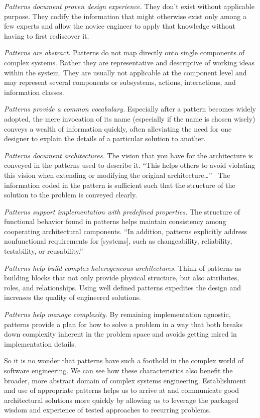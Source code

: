 \documentclass[jou,apacite]{apa6}
\begin{document}
\emph{Patterns document proven design experience.}  They don't exist without applicable purpose.  They codify the information that might otherwise exist only among a few experts and allow the novice engineer to apply that knowledge without having to first rediscover it.

\emph{Patterns are abstract.}  Patterns do not map directly onto single components of complex systems. Rather they are representative and descriptive of working ideas within the system.  They are usually not applicable at the component level and may represent several components or subsystems, actions, interactions, and information classes.

\emph{Patterns provide a common vocabulary.}  Especially after a pattern becomes widely adopted, the mere invocation of its name (especially if the name is chosen wisely) conveys a wealth of information quickly, often alleviating the need for one designer to explain the details of a particular solution to another.

\emph{Patterns document architectures.} The vision that you have for the architecture is conveyed in the patterns used to describe it.  ``This helps others to avoid violating this vision when extending or modifying the original architecture\dots''~\cite[page 6]{Buschmann}  The information coded in the pattern is sufficient such that the structure of the solution to the problem is conveyed clearly.

\emph{Patterns support implementation with predefined properties.}  The structure of functional behavior found in patterns helps maintain consistency among cooperating architectural components.  ``In addition, patterns explicitly address nonfunctional requirements for [systems], such as changeability, reliability, testability, or reusability.''~\cite[page 7]{Buschmann}

\emph{Patterns help build complex heterogeneous architectures.}  Think of patterns as building blocks that not only provide physical structure, but also attributes, roles, and relationships.  Using well defined patterns expedites the design and increases the quality of engineered solutions.  

\emph{Patterns help manage complexity.}  By remaining implementation agnostic, patterns provide a plan for how to solve a problem in a way that both breaks down complexity inherent in the problem space and avoids getting mired in implementation details.

So it is no wonder that patterns have such a foothold in the complex world of software engineering.  We can see how these characteristics also benefit the broader, more abstract domain of complex systems engineering.  Establishment and use of appropriate patterns helps us to arrive at and communicate good architectural solutions more quickly by allowing us to leverage the packaged wisdom and experience of tested approaches to recurring problems.
\end{document}
